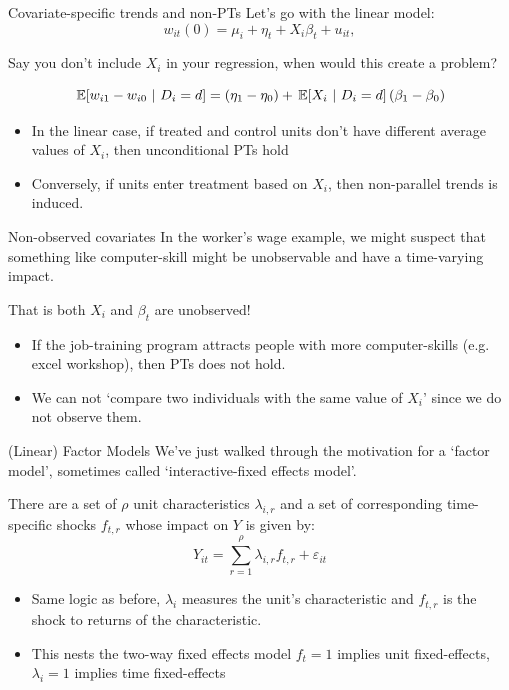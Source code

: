 \documentclass[t]{beamer}
\begin{document}
\begin{frame}{Covariate-specific trends and non-PTs}
  Let's go with the linear model:
  $$
    w_{it}(0) = \mu_i + \eta_t + X_i \beta_t + u_{it},
  $$ 
  
  \pause
  Say you don't include $X_i$ in your regression, when would this create a problem?

  $$
    \expec{w_{i1} - w_{i0}}{D_i = d} = 
      \left( \eta_1 - \eta_0 \right) + 
      \expec{X_i}{D_i = d} \left( \beta_1 - \beta_0 \right)
  $$
  \begin{itemize}
    \item In the linear case, if treated and control units don't have different average values of $X_i$, then unconditional PTs hold
    
    \item Conversely, if units enter treatment based on $X_i$, then non-parallel trends is induced.
  \end{itemize}
\end{frame}

\begin{frame}{Non-observed covariates}
  In the worker's wage example, we might suspect that something like computer-skill might be unobservable and have a time-varying impact. 
  
  \bigskip That is both $X_i$ and $\beta_t$ are unobserved!

  \begin{itemize}
    \item If the job-training program attracts people with more computer-skills (e.g. excel workshop), then PTs does not hold.
    \item We can not `compare two individuals with the same value of $X_i$' since we do not observe them.
  \end{itemize}
\end{frame}


\begin{frame}{(Linear) Factor Models}
  We've just walked through the motivation for a `factor model', sometimes called `interactive-fixed effects model'.

  \bigskip
  There are a set of $\rho$ unit characteristics $\lambda_{i,r}$ and a set of corresponding time-specific shocks $f_{t, r}$ whose impact on $Y$ is given by:
  $$
    Y_{it} = \sum_{r=1}^\rho \lambda_{i, r} f_{t, r} + \varepsilon_{it}
  $$

  \begin{itemize}
    \item Same logic as before, $\lambda_i$ measures the unit's characteristic and $f_{t,r}$ is the shock to returns of the characteristic.
    
    \pause
    \item This nests the two-way fixed effects model $f_t = 1$ implies unit fixed-effects, $\lambda_i = 1$ implies time fixed-effects
  \end{itemize}
\end{frame}
\end{document}
